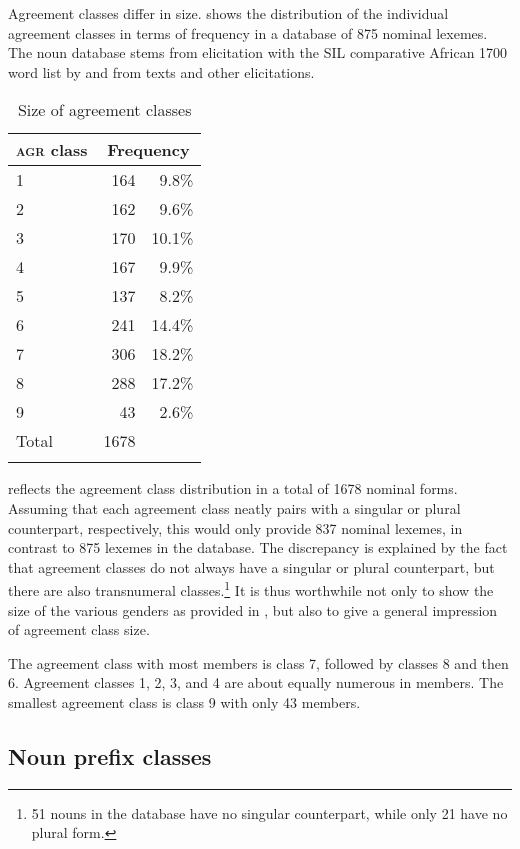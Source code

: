 Agreement classes differ in size.  shows the distribution of the individual agreement classes in terms of frequency in a database of 875 nominal lexemes. The noun database stems from elicitation with the SIL comparative African 1700 word list by \citet{roberts2006} and from texts and other elicitations.


\begin{table}
\begin{tabular}{lrr}
 \lsptoprule
\textsc{agr} class &  \multicolumn{2}{c}{Frequency}  \\ %
 \midrule
1 & 164 & 9.8\%  \\ %
2  & 162 & 9.6\% \\
3  &  170 & 10.1\%   \\ %
4   & 167 & 9.9\% \\
5   & 137 & 8.2\% \\
6  &  241 & 14.4\% \\
7   &  306 & 18.2\% \\
8   & 288 & 17.2\% \\
9   & 43 & 2.6\% \\
 \midrule
Total & 1678 & \\
 \lspbottomrule
\end{tabular}
\caption{Size of agreement classes}
\label{Tab:AGRno}
\end{table}

 reflects the agreement class distribution in a total of 1678 nominal forms. Assuming that each agreement class neatly pairs with a singular or plural counterpart, respectively, this would only provide 837 nominal lexemes, in contrast to 875 lexemes in the database. The discrepancy is explained by the fact that agreement classes do not always have a singular or plural counterpart, but there are also transnumeral classes.\footnote{51 nouns in the database have no singular counterpart, while only 21 have no plural form.}  It is thus worthwhile not only to show the size of the various genders as provided in , but also to give a general impression of agreement class size.

 The agreement class with most members is class 7, followed by classes 8 and then 6. Agreement classes 1, 2, 3, and 4 are about equally numerous in members. The smallest agreement class is class 9 with only 43 members.  

\subsection{Noun prefix classes}
\label{sec:NC}



